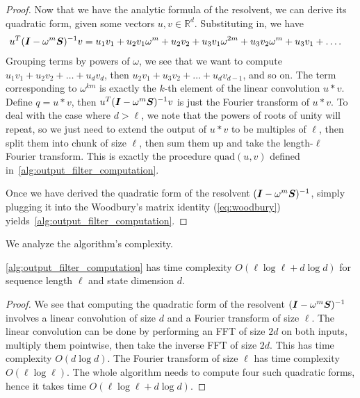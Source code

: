 \begin{proof}
Now that we have the analytic formula of the resolvent, we can derive its
quadratic form, given some vectors $u, v \in \mathbb{R}^d$.
Substituting in, we have
\begin{align*}
  u^T (\boldsymbol{I} - \omega^m \boldsymbol{S})^{-1} v
  &= u_1 v_1 + u_2 v_1 \omega^m + u_2 v_2 + u_3 v_1 \omega^{2m} + u_3 v_2 \omega^m + u_3 v_1 + \dots.
\end{align*}
Grouping terms by powers of $\omega$, we see that we want to compute
$u_1 v_1 + u_2 v_2 + \dots + u_d v_d$, then
$u_2v_1 + u_3v_2 + \dots + u_d v_{d-1}$, and so on.
The term corresponding to $\omega^{km}$ is exactly the $k$-th element of the linear
convolution $u \ast v$.
Define $q = u \ast v$, then $u^T(\boldsymbol{I} - \omega^m \boldsymbol{S})^{-1} v$ is just the Fourier
transform of $u \ast v$.
To deal with the case where $d > \ell$, we note that the powers of roots of unity
will repeat, so we just need to extend the output of $u \ast v$ to be multiples of
$\ell$, then split them into chunk of size $\ell$, then sum them up and take the
length-$\ell$ Fourier transform.
This is exactly the procedure $\mathrm{quad}(u, v)$ defined in~\cref{alg:output_filter_computation}.

Once we have derived the quadratic form of the resolvent $(\boldsymbol{I} - \omega^m \boldsymbol{S})^{-1}$,
simply plugging it into the Woodbury's matrix identity (\cref{eq:woodbury})
yields~\cref{alg:output_filter_computation}.

\end{proof}

We analyze the algorithm's complexity.
\begin{theorem}
  \cref{alg:output_filter_computation} has time complexity
  $O(\ell \log \ell + d \log d)$ for sequence length $\ell$ and state dimension $d$.
\end{theorem}

\begin{proof}
  We see that computing the quadratic form of the resolvent
  $(\boldsymbol{I} - \omega^m \boldsymbol{S})^{-1}$ involves a linear convolution of size $d$ and a Fourier
  transform of size $\ell$.
  The linear convolution can be done by performing an FFT of size $2d$ on both
  inputs, multiply them pointwise, then take the inverse FFT of size $2d$.
  This has time complexity $O(d \log d)$.
  The Fourier transform of size $\ell$ has time complexity $O(\ell \log \ell)$.
  The whole algorithm needs to compute four such quadratic forms, hence it takes
  time $O(\ell \log \ell + d \log d)$.
\end{proof}



